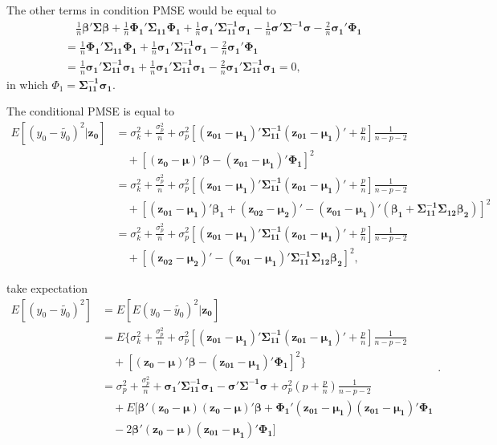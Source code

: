 The other terms in condition PMSE would be equal to
$$\begin{aligned}
&\quad\frac{1}{n}\boldsymbol{\beta'\Sigma\beta}+\frac{1}{n}\boldsymbol{\Phi_1'\Sigma_{11}\Phi_1}+\frac{1}{n}\boldsymbol{\sigma_1'\Sigma_{11}^{-1}\sigma_1}-\frac{1}{n}\boldsymbol{\sigma'\Sigma^{-1}\sigma}-\frac{2}{n}\boldsymbol{\sigma_1'\Phi_1}\\
&=\frac{1}{n}\boldsymbol{\Phi_1'\Sigma_{11}\Phi_1}+\frac{1}{n}\boldsymbol{\sigma_1'\Sigma_{11}^{-1}\sigma_1}-\frac{2}{n}\boldsymbol{\sigma_1'\Phi_1}\\
&=\frac{1}{n}\boldsymbol{\sigma_1'\Sigma_{11}^{-1}\sigma_1}+\frac{1}{n}\boldsymbol{\sigma_1'\Sigma_{11}^{-1}\sigma_1}-\frac{2}{n}\boldsymbol{\sigma_1'\Sigma_{11}^{-1}\sigma_1}=0,
\end{aligned}$$
in which $\Phi_1 = \boldsymbol{\Sigma_{11}^{-1}\sigma_1}$.



The conditional PMSE is equal to
$$\begin{aligned}
E[(y_0-\tilde{y_0})^2|\boldsymbol{z_0}] &= \sigma_k^2+\frac{\sigma_p^2}{n}+\sigma_p^2\left[\boldsymbol{(z_{01}-\mu_1)'\Sigma_{11}^{-1}(z_{01}-\mu_1)'}+\frac{p}{n}\right]\frac{1}{n-p-2}\\
&\quad+[\boldsymbol{(z_0-\mu)'\beta-(z_{01}-\mu_1)'\Phi_1}]^2\\
&=\sigma_k^2+\frac{\sigma_p^2}{n}+\sigma_p^2\left[\boldsymbol{(z_{01}-\mu_1)'\Sigma_{11}^{-1}(z_{01}-\mu_1)'}+\frac{p}{n}\right]\frac{1}{n-p-2}\\
&\quad+[\boldsymbol{(z_{01}-\mu_1)'\beta_1+(z_{02}-\mu_2)'-(z_{01}-\mu_1)'(\beta_1+\Sigma_{11}^{-1}\Sigma_{12}\beta_2)}]^2\\
&=\sigma_k^2+\frac{\sigma_p^2}{n}+\sigma_p^2\left[\boldsymbol{(z_{01}-\mu_1)'\Sigma_{11}^{-1}(z_{01}-\mu_1)'}+\frac{p}{n}\right]\frac{1}{n-p-2}\\
&\quad+[\boldsymbol{(z_{02}-\mu_2)'-(z_{01}-\mu_1)'\Sigma_{11}^{-1}\Sigma_{12}\beta_2}]^2,
\end{aligned}$$


take expectation
$$\begin{aligned}
E[(y_0-\tilde{y_0})^2]
&=E[E(y_0-\tilde{y_0})^2|\boldsymbol{z_0}]\\
&=E\{\sigma_k^2+\frac{\sigma_p^2}{n}+\sigma_p^2\left[\boldsymbol{(z_{01}-\mu_1)'\Sigma_{11}^{-1}(z_{01}-\mu_1)'}+\frac{p}{n}\right]\frac{1}{n-p-2}\\
&\quad+[\boldsymbol{(z_0-\mu)'\beta-(z_{01}-\mu_1)'\Phi_1}]^2\}\\
&=\sigma_p^2+\frac{\sigma_p^2}{n}+\boldsymbol{\sigma_1'\Sigma_{11}^{-1}\sigma_1-\sigma'\Sigma^{-1}\sigma}+\sigma_p^2\left(p+\frac{p}{n}\right)\frac{1}{n-p-2}\\
&\quad+E[\boldsymbol{\beta'(z_0-\mu)(z_0-\mu)'\beta+\Phi_1'(z_{01}-\mu_1)(z_{01}-\mu_1)'\Phi_1}\\
&\quad-2\boldsymbol{\beta'(z_0-\mu)(z_{01}-\mu_1)'\Phi_1}]
\end{aligned}.$$

